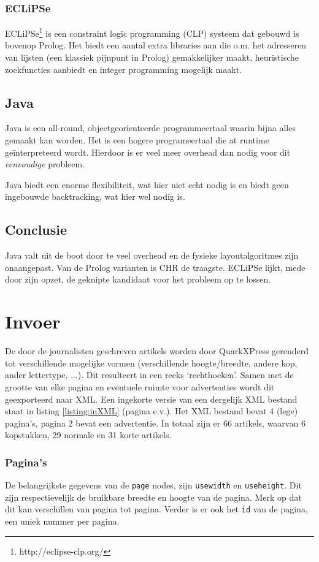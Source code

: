 \documentclass[a4paper,12pt]{report}
\begin{document}
			\subsubsection{ECLiPSe}
ECLiPSe\footnote{http://eclipse-clp.org/} is een constraint logic programming (CLP) systeem dat gebouwd is bovenop Prolog. Het biedt een aantal extra libraries aan die o.m. het adresseren van lijsten (een klassiek pijnpunt in Prolog) gemakkelijker maakt, heuristische zoekfuncties aanbiedt en integer programming mogelijk maakt.
		
		\subsection{Java}
Java is een all-round, objectgeorienteerde programmeertaal waarin bijna alles gemaakt kan worden. Het is een hogere programeertaal die at runtime geïnterpreteerd wordt. Hierdoor is er veel meer overhead dan nodig voor dit \textit{eenvoudige} probleem.

Java biedt een enorme flexibiliteit, wat hier niet echt nodig is en biedt geen ingebouwde backtracking, wat hier wel nodig is.

		\subsection{Conclusie}
Java valt uit de boot door te veel overhead en de fysieke layoutalgoritmes zijn onaangepast. Van de Prolog varianten is CHR de traagste. ECLiPSe lijkt, mede door zijn opzet, de geknipte kandidaat voor het probleem op te lossen.

	\section{Invoer}
De door de journalisten geschreven artikels worden door QuarkXPress gerenderd tot verschillende mogelijke vormen (verschillende hoogte/breedte, andere kop, ander lettertype, ...). Dit resulteert in een reeks `rechthoeken'. Samen met de grootte van elke pagina en eventuele ruimte voor advertenties wordt dit geexporteerd naar XML. Een ingekorte versie van een dergelijk XML bestand staat in listing \ref{listing:inXML} (pagina \pageref{listing:inXML} e.v.). Het XML bestand bevat 4 (lege) pagina's, pagina 2 bevat een advertentie. In totaal zijn er 66 artikels, waarvan 6 kopstukken, 29 normale en 31 korte artikels.

			\subsubsection{Pagina's}
De belangrijkste gegevens van de \verb|page| nodes, zijn \verb|usewidth| en \verb|useheight|. Dit zijn respectievelijk de bruikbare breedte en hoogte van de pagina. Merk op dat dit kan verschillen van pagina tot pagina. Verder is er ook het \verb|id| van de pagina, een uniek nummer per pagina.
\end{document}
